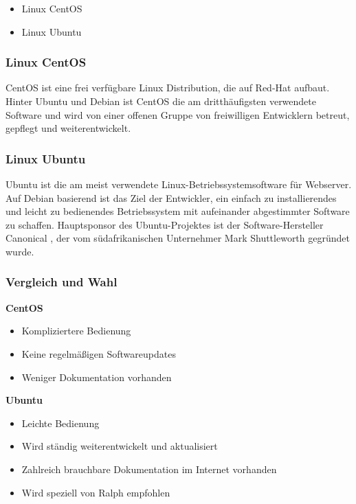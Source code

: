 \begin{itemize}
\tightlist
\item
  Linux CentOS
\item
  Linux Ubuntu
\end{itemize}

\hypertarget{linux-centos}{%
\subsubsection{Linux CentOS}\label{linux-centos}}

CentOS ist eine frei verfügbare Linux Distribution, die auf Red-Hat
\cite{redhat} aufbaut. Hinter Ubuntu und Debian ist CentOS die am
dritthäufigsten verwendete Software und wird von einer offenen Gruppe
von freiwilligen Entwicklern betreut, gepflegt und weiterentwickelt.

\hypertarget{linux-ubuntu}{%
\subsubsection{Linux Ubuntu}\label{linux-ubuntu}}

Ubuntu ist die am meist verwendete Linux-Betriebssystemsoftware für
Webserver. Auf Debian basierend ist das Ziel der Entwickler, ein einfach
zu installierendes und leicht zu bedienendes Betriebssystem mit
aufeinander abgestimmter Software zu schaffen. Hauptsponsor des
Ubuntu-Projektes ist der Software-Hersteller Canonical \cite{canonical},
der vom südafrikanischen Unternehmer Mark Shuttleworth \cite{mark}
gegründet wurde.

\hypertarget{vergleich-und-wahl}{%
\subsubsection{\texorpdfstring{Vergleich und Wahl
\cite{wahl}}{Vergleich und Wahl }}\label{vergleich-und-wahl}}

\textbf{CentOS}

\begin{itemize}
\tightlist
\item
  Kompliziertere Bedienung
\item
  Keine regelmäßigen Softwareupdates
\item
  Weniger Dokumentation vorhanden
\end{itemize}

\textbf{Ubuntu}

\begin{itemize}
\tightlist
\item
  Leichte Bedienung
\item
  Wird ständig weiterentwickelt und aktualisiert
\item
  Zahlreich brauchbare Dokumentation im Internet vorhanden
\item
  Wird speziell von Ralph empfohlen
\end{itemize}

